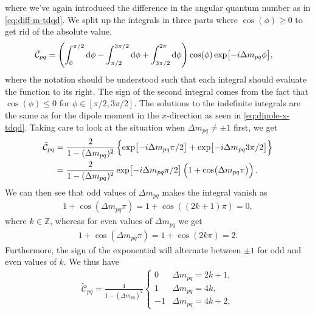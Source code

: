         where we've again introduced the difference in the angular quantum
        number as in \autoref{eq:diff-m-tdqd}.
        We split up the integrals in three parts where $\cos(\phi) \geq 0$ to
        get rid of the absolute value.
        \begin{align}
            \tilde{\mathcal{C}}_{pq}
            &=
            \left( 
                \int_{0}^{\pi/2}
                \dd \phi
                -
                \int_{\pi/2}^{3\pi/2}
                \dd \phi
                +
                \int_{3\pi/2}^{2\pi}
                \dd \phi
             \right)
            \cos(\phi)
            \exp[-i\Delta m_{pq}\phi],
        \end{align}
        where the notation should be understood such that each integral should
        evaluate the function to its right.
        The sign of the second integral comes from the fact that $\cos(\phi)
        \leq 0$ for $\phi \in [\pi/2, 3\pi/2]$.
        The solutions to the indefinite integrals are the same as for the dipole
        moment in the $x$-direction as seen in \autoref{eq:dipole-x-tdqd}.
        Taking care to look at the situation when $\Delta m_{pq} \neq \pm 1$
        first, we get
        \begin{align}
            \tilde{\mathcal{C}}_{pq}
            &=
            \frac{2}{1 - (\Delta m_{pq})^2}\left\{ 
                \exp[-i\Delta m_{pq} \pi / 2]
                + \exp[-i \Delta m_{pq} 3\pi / 2]
             \right\}
            \\
            &= \frac{2}{1 - (\Delta m_{pq})^2}
            \exp[-i\Delta m_{pq} \pi / 2]
            \left( 
                1 + \cos(\Delta m_{pq} \pi)
             \right).
        \end{align}
        We can then see that odd values of $\Delta m_{pq}$ makes the integral
        vanish as
        \begin{align}
            1 + \cos(\Delta m_{pq} \pi)
            = 1 + \cos((2k + 1) \pi) = 0,
        \end{align}
        where $k \in \mathbb{Z}$, whereas for even values of $\Delta m_{pq}$ we
        get
        \begin{align}
            1 + \cos(\Delta m_{pq} \pi)
            = 1 + \cos(2k \pi) = 2.
        \end{align}
        Furthermore, the sign of the exponential will alternate between $\pm 1$
        for odd and even values of $k$.
        We thus have
        \begin{align}
            \tilde{\mathcal{C}}_{pq}
            =
            \frac{4}{1 - (\Delta m_{pq})^2}
            \begin{cases}
                0 & \Delta m_{pq} = 2k + 1, \\
                1 & \Delta m_{pq} = 4k, \\
                -1 & \Delta m_{pq} = 4k + 2,
            \end{cases}
        \end{align}
